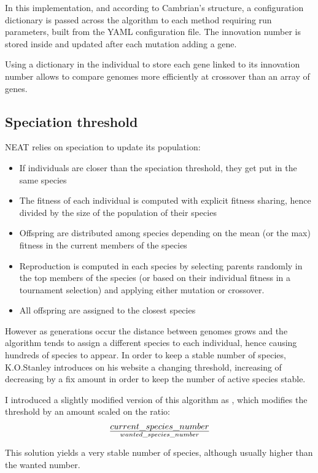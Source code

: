 In this implementation, and according to Cambrian's structure, a configuration dictionary is passed across the algorithm to each method requiring run parameters, built from the YAML configuration file. The innovation number is stored inside and updated after each mutation adding a gene. 

Using a dictionary in the individual to store each gene linked to its innovation number allows to compare genomes more efficiently at crossover than an array of genes. 

\subsection{Speciation threshold}
NEAT relies on speciation to update its population:
\begin{itemize}
    \item If individuals are closer than the speciation threshold, they get put in the same species
    \item The fitness of each individual is computed with explicit fitness sharing, hence divided by the size of the population of their species
    \item Offspring are distributed among species depending on the mean (or the max) fitness in the current members of the species
    \item Reproduction is computed in each species by selecting parents randomly in the top members of the species (or based on their individual fitness in a tournament selection) and applying either mutation or crossover.
    \item All offspring are assigned to the closest species
\end{itemize}

However as generations occur the distance between genomes grows and the algorithm tends to assign a different species to each individual, hence causing hundreds of species to appear. In order to keep a stable number of species, K.O.Stanley introduces on his website a changing threshold, increasing of decreasing by a fix amount in order to keep the number of active species stable. 

I introduced a slightly modified version of this algorithm as , which modifies the threshold by an amount scaled on the ratio: $$current\_species\_number \over wanted\_species\_number$$

This solution yields a very stable number of species, although usually higher than the wanted number.

